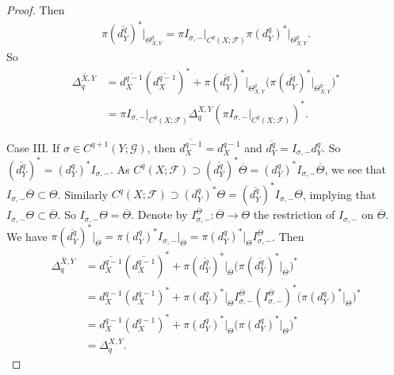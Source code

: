 \documentclass[11pt]{article}
\theoremstyle{definition}
\theoremstyle{definition}
\begin{document}
\begin{proof}
    Then 
    \begin{align*}
        \pi (\overline{d^q_{Y}})^{\ast} \vert_{\Theta^{q}_{X,Y}} = \pi I_{\sigma, -}\vert_{C^q(X; \mathscr{F})} \pi (d^q_{Y})^{\ast} \vert_{\Theta^{q}_{X,Y}}.
    \end{align*}
    So 
    \begin{align*}
        \overline{\Delta_q^{X,Y}} &= \overline{d^{q-1}_X} (\overline{d^{q-1}_X})^{\ast} + \pi (\overline{d^q_{Y}})^{\ast} \vert_{\Theta^{q}_{X,Y}} \big(\pi (\overline{d^q_{Y}})^{\ast} \vert_{\Theta^{q}_{X,Y}}\big)^{\ast} \\
        &= \pi I_{\sigma, -}\vert_{C^q(X;\mathscr{F})} \Delta_q^{X,Y} (\pi I_{\sigma, -}\vert_{C^q(X;\mathscr{F})})^{\ast}.
    \end{align*}
    
    Case III. If $\sigma \in C^{q+1}(Y; \mathscr{G})$,
    then $\overline{d^{q-1}_X} = d^{q-1}_X$ and $\overline{d^q_{Y}} = I_{\sigma, -} d^q_{Y}$.
    So 
    $(\overline{d^q_{Y}})^{\ast} = (d^q_{Y})^{\ast} I_{\sigma, -}$.
    As 
    $C^q(X;\mathscr{F}) \supset (\overline{d^q_{Y}})^{\ast} \overline{\Theta} = (d^q_{Y})^{\ast}
    I_{\sigma, -}\overline{\Theta}$, we see that 
    $I_{\sigma, -}\overline{\Theta} \subset \Theta$. 
    Similarly 
    $C^q(X;\mathscr{F}) \supset (d^q_{Y})^{\ast} \Theta = (\overline{d^q_{Y}})^{\ast} I_{\sigma,-}\Theta$,
    implying that 
    $I_{\sigma, -}\Theta \subset \overline{\Theta}$. 
    So $I_{\sigma, -}\Theta = \overline{\Theta}$.
    Denote by $I_{\sigma,-}^{\overline{\Theta}}: \overline{\Theta} \to \Theta$ the restriction of $I_{\sigma,-}$ on $\overline{\Theta}$.
    We have $\pi (\overline{d^q_{Y}})^{\ast}\vert_{\overline{\Theta}} = \pi (d_Y^q)^{\ast}I_{\sigma,-}\vert_{\overline{\Theta}} = \pi(d_Y^q)^{\ast}\vert_{\Theta}I_{\sigma,-}^{\overline{\Theta}}$. Then
    \begin{align*}
        \overline{\Delta_q^{X,Y}} &= \overline{d^{q-1}_X} (\overline{d^{q-1}_X})^{\ast} + \pi(\overline{d^q_{Y}})^{\ast}\vert_{\overline{\Theta}} \big(\pi (\overline{d^q_{Y}})^{\ast} \vert_{\overline{\Theta}}\big)^{\ast} \\
        &= d^{q-1}_X (d^{q-1}_X)^{\ast} + \pi(d^q_{Y})^{\ast}\vert_{\Theta} I_{\sigma, -}^{\overline{\Theta}} (I_{\sigma, -}^{\overline{\Theta}})^{\ast}
        \big(\pi (d^q_{Y})^{\ast}\vert_{\Theta}\big)^{\ast}\\
        &= d^{q-1}_X (d^{q-1}_X)^{\ast} + \pi(d^q_{Y})^{\ast}\vert_{\Theta}
        \big(\pi (d^q_{Y})^{\ast}\vert_{\Theta}\big)^{\ast}\\
        &= \Delta_q^{X,Y}.
    \end{align*}
\end{proof}
\end{document}
